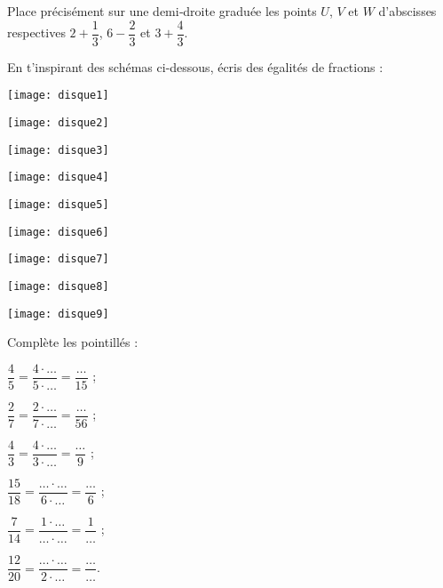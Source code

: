\begin{exercice}
Place précisément sur une demi‑droite graduée les points $U$, $V$ et $W$ d'abscisses respectives $2 + \dfrac{1}{3}$, $6 - \dfrac{2}{3}$ et $3 + \dfrac{4}{3}$.
\end{exercice}



\begin{exercice}
En t'inspirant des schémas ci-dessous, écris des égalités de fractions :
\begin{colenumerate}{3}
 \item
 
 \texttt{[image: disque1]}
 \item
 
 \texttt{[image: disque2]}
 \item
 
 \texttt{[image: disque3]}
 \item
 
 \texttt{[image: disque4]}
 \item
 
 \texttt{[image: disque5]}
 \item
 
 \texttt{[image: disque6]}
 \item
 
 \texttt{[image: disque7]}
 \item
 
 \texttt{[image: disque8]}
 \item
 
 \texttt{[image: disque9]}
 \end{colenumerate}
\end{exercice}


\begin{exercice}
Complète les pointillés :
\vspace{.5cm}
\begin{colenumerate}{2}
 \item $\dfrac{4}{5} = \dfrac{4 \cdot \ldots}{5 \cdot \ldots} = \dfrac{\ldots}{15}$ ;
 \vspace{0.5cm}
 \item $\dfrac{2}{7} = \dfrac{2 \cdot \ldots}{7 \cdot \ldots} = \dfrac{\ldots}{56}$ ;
 \vspace{0.5cm}
 \item $\dfrac{4}{3} = \dfrac{4 \cdot \ldots}{3 \cdot \ldots} = \dfrac{\ldots}{9}$ ;
 \item $\dfrac{15}{18} = \dfrac{\ldots \cdot \ldots}{6 \cdot \ldots} = \dfrac{\ldots}{6}$ ;
 \item $\dfrac{7}{14} = \dfrac{1 \cdot \ldots}{\ldots \cdot \ldots} = \dfrac{1}{\ldots}$ ;
 \item $\dfrac{12}{20} = \dfrac{\ldots \cdot \ldots}{2 \cdot \ldots} = \dfrac{\ldots}{\ldots}$.
 \end{colenumerate}
\end{exercice}

